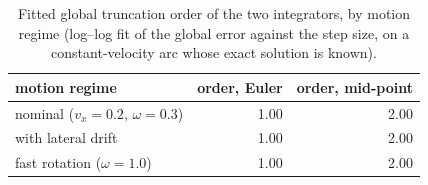 \begin{table}[htbp]
  \centering
  \small
  \caption{Fitted global truncation order of the two integrators, by motion regime (log--log fit of the global error against the step size, on a constant-velocity arc whose exact solution is known).}
  \label{res:tab:order}
  \begin{tabular}{lrr}
    \toprule
    motion regime & order, Euler & order, mid-point \\
    \midrule
    nominal ($v_x=0.2$, $\omega=0.3$) & 1.00 & 2.00 \\
    with lateral drift & 1.00 & 2.00 \\
    fast rotation ($\omega=1.0$) & 1.00 & 2.00 \\
    \bottomrule
  \end{tabular}
\end{table}

